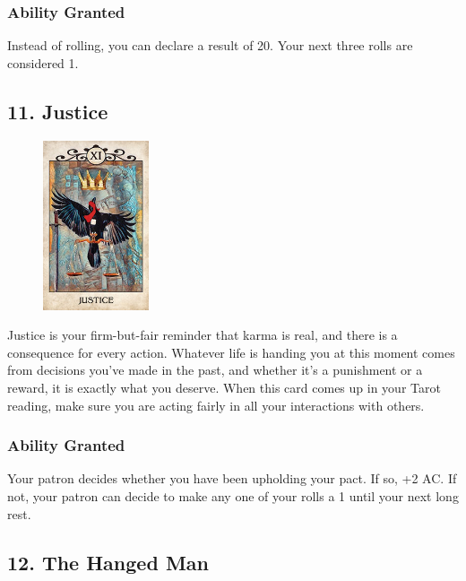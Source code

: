 \documentclass[10pt,twoside,twocolumn,openany,nodeprecatedcode]{dndbook}
\begin{document}
    \subsubsection*{Ability Granted}
    Instead of rolling, you can declare a result of 20. Your next three rolls are considered 1.

    \subsection*{11. Justice}

    \begin{figure}
        \includegraphics[height=5cm,width=\linewidth]{justice.jpg}
    \end{figure}
    Justice is your firm-but-fair reminder that karma is real, and there is a consequence for every action. Whatever life is handing you at this moment comes from decisions you've made in the past, and whether it's a punishment or a reward, it is exactly what you deserve. When this card comes up in your Tarot reading, make sure you are acting fairly in all your interactions with others.

    \subsubsection*{Ability Granted}
    Your patron decides whether you have been upholding your pact. If so, +2 AC. If not, your patron can decide to make any one of your rolls a 1 until your next long rest.

    \subsection*{12. The Hanged Man}
\end{document}
